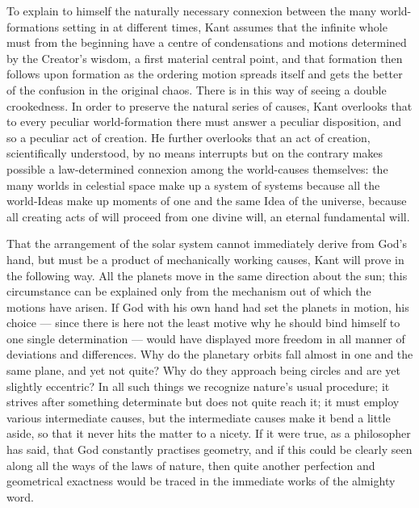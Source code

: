 \documentclass[12pt,a4paper]{book}
\begin{document}
To explain to himself the naturally necessary connexion between the many world-formations setting in at different
times, Kant assumes that the infinite whole must from the beginning have a centre of condensations and motions
determined by the Creator's wisdom, a first material central point, and that formation then follows upon formation
as the ordering motion spreads itself and gets the better of the confusion in the original chaos. There is in this
way of seeing a double crookedness. In order to preserve the natural series of causes, Kant overlooks that to
every peculiar world-formation there must answer a peculiar disposition, and so a peculiar act of creation. He
further overlooks that an act of creation, scientifically understood, by no means interrupts but on the contrary
makes possible a law-determined connexion among the world-causes themselves: the many worlds in celestial space
make up a system of systems because all the world-Ideas make up moments of one and the same Idea of the universe,
because all creating acts of will proceed from one divine will, an eternal fundamental will.

That the arrangement of the solar system cannot immediately derive from God's hand, but must be a product of
mechanically working causes, Kant will prove in the following way. All the planets move in the same direction
about the sun;
this circumstance can be explained only from the mechanism out of which the motions have arisen. If God with his
own hand had set the planets in motion, his choice --- since there is here not the least motive why he should
bind himself to one single determination --- would have displayed more freedom in all manner of deviations and
differences. Why do the planetary orbits fall almost in one and the same plane, and yet not quite? Why do they
approach being circles and are yet slightly eccentric? In all such things we recognize nature's usual procedure;
it strives after something determinate but does not quite reach it; it must employ various intermediate causes,
but the intermediate causes make it bend a little aside, so that it never hits the matter to a nicety. If it were
true, as a philosopher has said, that God constantly practises geometry, and if this could be clearly seen along
all the ways of the laws of nature, then quite another perfection and geometrical exactness would be traced in
the immediate works of the almighty word.
\end{document}
